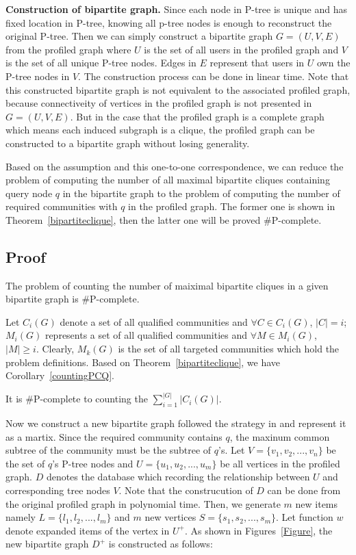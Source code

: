 {\bf Construction of bipartite graph.}
Since each node in P-tree is unique and has fixed location in P-tree, knowing all p-tree nodes is enough to reconstruct the original P-tree. Then we can simply construct a bipartite graph $G=(U,V,E)$ from the profiled graph where $U$ is the set of all users in the profiled graph and $V$ is the set of all unique P-tree nodes. Edges in $E$ represent that users in $U$ own the P-tree nodes in $V$. The construction process can be done in linear time. Note that this constructed bipartite graph is not equivalent to the associated profiled graph, because connectiveity of vertices in the profiled graph is not presented in $G=(U,V,E)$. But in the case that the profiled graph is a complete graph which means each induced subgraph is a clique, the profiled graph can be constructed to a bipartite graph without losing generality. 

Based on the assumption and this one-to-one correspondence, we can reduce the problem of computing the number of all maximal bipartite cliques containing query node $q$ in the bipartite graph to the problem of computing the number of required communities with $q$ in the profiled graph. The former one is shown in Theorem~\ref{bipartiteclique}, then the latter one will be proved $\#$P-complete.

\subsection{Proof}
 \begin{theorem}
\label{bipartiteclique}
The problem of counting the number of maiximal bipartite cliques in a given bipartite graph is $\#$P-complete.
\end{theorem}

Let $C_i(G)$ denote a set of all qualified communities and $\forall C \in C_i(G)$, $|C|=i$; $M_i(G)$ represents a set of all qualified communities and $\forall M \in M_i(G)$, $|M|\geq i$. Clearly, $M_k(G)$ is the set of all targeted communities which hold the problem definitions.
Based on Theorem~\ref{bipartiteclique}, we have Corollary~\ref{countingPCQ}. 

\begin{corollary}
\label{countingPCQ}
It is $\#$P-complete to counting the $\sum_{i=1}^{|G|}{|C_i(G)|}$.
\end{corollary}

Now we construct a new bipartite graph followed the strategy in \cite{yang2004complexity} and represent it as a martix. 
Since the required community contains $q$, the maxinum common subtree of the community must be the subtree of $q$'s. Let $V=\{v_1,v_2,...,v_n\}$ be the set of $q$'s P-tree nodes and $U=\{u_1,u_2,...,u_m\}$ be all vertices in the profiled graph. $D$ denotes the database which recording the relationship between $U$ and corresponding tree nodes $V$. Note that the construcution of $D$ can be done from the original profiled graph in polynomial time. Then, we generate $m$ new items namely $L=\{l_1,l_2,...,l_m\}$ and $m$ new vertices $S=\{s_1,s_2,...,s_m\}$. Let function $w$ denote expanded items of the vertex in $U^+$. As shown in Figures~\ref{Figure}, the new bipartite graph $D^+$ is constructed as follows: 

